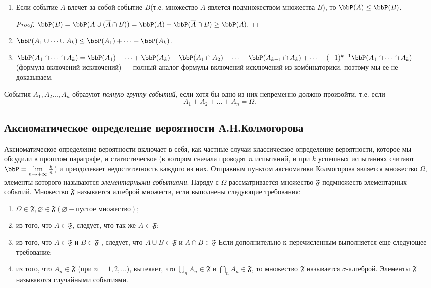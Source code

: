 \begin{enumerate}
\item
Если событие $A$ влечет за собой событие $B$(т.е. множество $A$ явлется подмножеством множества $B$), то $\bbP(A)\le\bbP(B)$.
\begin{proof}
$\bbP(B)=\bbP(A\cup (\overline{A}\cap B))=\bbP(A)+\bbP(\overline{A}\cap B)\ge \bbP(A).$
\end{proof}

\item
$\bbP(A_1\cup\dots\cup A_k) \le \bbP(A_1)+\dots+\bbP(A_k)$.

\item
$\bbP(A_1\cap\dots\cap A_k)= \bbP(A_1)+\dots+\bbP(A_k)-\bbP(A_1\cap A_2)-\dots -\bbP(A_{k-1}\cap A_{k})+ \dots + (-1)^{k-1}\bbP(A_1\cap\dots\cap A_k)  $ (формула включений-исключений) --- полный аналог формулы включений-исключений из комбинаторики, поэтому мы ее не доказываем.
\end{enumerate}

\begin{defn}
События $A_1,A_2\dots,A_n$ образуют \textit{полную группу событий}, если хотя бы одно из них непременно должно произойти, т.е. если
$$
A_1+A_2+\dots+A_n=\Omega.
$$
\end{defn}

\subsection{Аксиоматическое определение вероятности А.Н.Колмогорова}

Аксиоматическое определение вероятности включает в себя, как частные случаи классическое определение вероятности, которое мы обсудили в прошлом параграфе, и статистическое (в котором сначала проводят $n$ испытаний, и при $k$ успешных испытаниях считают $\bbP=\lim_{n \to +\infty}\limits\frac{k}{n}$) и преодолевает недостаточность каждого из них.
Отправным пунктом аксиоматики Колмогорова является множество $\Omega$, элементы которого называются \textit{элементарными событиями}. Наряду с $\Omega$ рассматривается множество $\mathfrak{F}$ подмножеств элементарных событий. Множество $\mathfrak{F}$ называется алгеброй множеств, если выполнены следующие требования:
\begin{enumerate}
\item
$\Omega \in \mathfrak{F}, \varnothing \in \mathfrak{F} (\varnothing - \text{пустое множество});$
\item
из того, что $A \in \mathfrak{F}$, следует, что так же $\overline{A} \in \mathfrak{F}$;
\item
из того, что  $A \in \mathfrak{F}$ и $B \in \mathfrak{F}$ , следует, что $A \cup B \in \mathfrak{F}$ и $A \cap B \in \mathfrak{F}$
Если дополнительно к перечисленным выполняется еще следующее требование:
\item
из того, что $A_n \in \mathfrak{F}$ (при $n = 1,2, \ldots$), вытекает, что $\bigcup\limits_{n} A_n \in \mathfrak{F}$ и $\bigcap\limits_{n} A_n \in \mathfrak{F}$, то множество $\mathfrak{F}$ называется $\sigma$-алгеброй. Элементы $\mathfrak{F}$ называются случайными событиями.
\end{enumerate}

